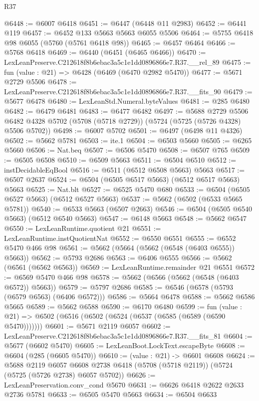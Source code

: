 \begin{lexlean}{R37}
\begin{coremodule}
@6448 := @6007 @6418
@6451 := @6447 (@6448 @11 @2983)
@6452 := @6441 @119
@6457 := @6452 @133 @5663 @5663 @6055 @5506
@6464 := @5755 @6418 @98 @6055 (@5760 (@5761 @6418 @98))
@6465 := @6457 @6464
@6466 := @5768 @6418
@6469 := @6440 (@6451 (@6465 @6466))
@6470 := LexLeanPreserve.C212618f8b6ebac3a5c1e1dd0896866e7.R37.__rel_89
@6475 := fun (value : @21) => @6428 (@6469 (@6470 @2982 @5470))
@6477 := @5671 @2729 @5506
@6478 := LexLeanPreserve.C212618f8b6ebac3a5c1e1dd0896866e7.R37.__fits_90
@6479 := @5677 @6478
@6480 := LexLeanStd.Numeral.byteValues
@6481 := @285 @6480
@6482 := @6479 @6481
@6483 := @6477 @6482
@6497 := @5688
    @2729
    @5506
    @6482
    @4328
    @5702
    (@5708 (@5718 @2729))
    (@5724 (@5725 (@5726 @4328) @5506 @5702))
@6498 := @6007 @5702
@6501 := @6497 (@6498 @11 @4326)
@6502 := @5662 @5781
@6503 := ite.{1}
@6504 := @6503 @5660
@6505 := @6265 @5660
@6506 := Nat.beq
@6507 := @6506 @5470
@6508 := @6507 @765
@6509 := @6505 @6508
@6510 := @6509 @5663
@6511 := @6504 @6510
@6512 := instDecidableEqBool
@6516 := @6511 (@6512 @6508 @5663) @5663
@6517 := @6507 @2637
@6524 := @6504 (@6505 @6517 @5663) (@6512 @6517 @5663) @5663
@6525 := Nat.blt
@6527 := @6525 @5470 @680
@6533 := @6504 (@6505 @6527 @5663) (@6512 @6527 @5663)
@6537 := @5662 (@6502 (@6533 @5665 @5781))
@6540 := @6533 @5663 (@6507 @2663)
@6546 := @6504 (@6505 @6540 @5663) (@6512 @6540 @5663)
@6547 := @6148 @5663
@6548 := @5662 @6547
@6550 := LexLeanRuntime.quotient @21
@6551 := LexLeanRuntime.instQuotientNat
@6552 := @6550 @6551
@6555 := @6552 @5470 @466 @98
@6561 := @5662 (@5664 (@5662 (@6548 (@6403 @6555)) @5663))
@6562 := @5793 @2686
@6563 := @6406 @6555
@6566 := @5662 (@6561 (@6562 @6563))
@6569 := LexLeanRuntime.remainder @21 @6551
@6572 := @6569 @5470 @466 @98
@6578 := @5662 (@6566 (@5662 (@6548 (@6403 @6572)) @5663))
@6579 := @5797 @2686
@6585 := @6546 (@6578 (@5793 (@6579 @6563) (@6406 @6572)))
@6586 := @5664 @6478
@6588 := @5662 @6586 @5665
@6589 := @5662 @6588
@6590 := @6170 @6480
@6599 := fun (value : @21) => @6502 (@6516 (@6502 (@6524 (@6537 (@6585 (@6589 (@6590 @5470)))))))
@6601 := @5671 @2119 @6057
@6602 := LexLeanPreserve.C212618f8b6ebac3a5c1e1dd0896866e7.R37.__fits_81
@6604 := @5677 (@6602 @5470)
@6605 := LexLeanBoot.LockText.escapeByte
@6608 := @6604 (@285 (@6605 @5470))
@6610 := (value : @21) -> @6601 @6608
@6624 := @5688
    @2119
    @6057
    @6608
    @2738
    @6418
    (@5708 (@5718 @2119))
    (@5724 (@5725 (@5726 @2738) @6057 @5702))
@6626 := LexLeanPreservation.conv_cond @5670
@6631 := @6626 @6418 @2622 @2633 @2736 @5781
@6633 := @6505 @5470 @5663
@6634 := @6504 @6633

\end{coremodule}
\end{lexlean}
